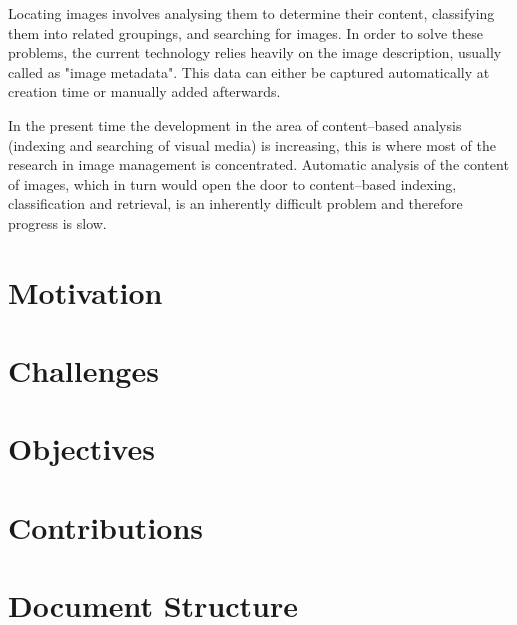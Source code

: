 Locating images involves analysing them to determine their content, classifying them into related groupings, and searching for  images. In order to solve these problems, the current technology relies heavily on the image description, usually called as "image metadata". This data can either be captured automatically at creation time or manually added afterwards.

In the present time the development in the area of content–based analysis (indexing and searching of visual media) is increasing, this is where most of the research in image management is concentrated. Automatic analysis of the content of images, which in turn would open the door to content–based indexing, classification and retrieval, is an inherently difficult problem and therefore progress is slow. \cite{Zhang2008}





\section{Motivation}



\section{Challenges}

\section{Objectives}

\section{Contributions}

\section{Document Structure}